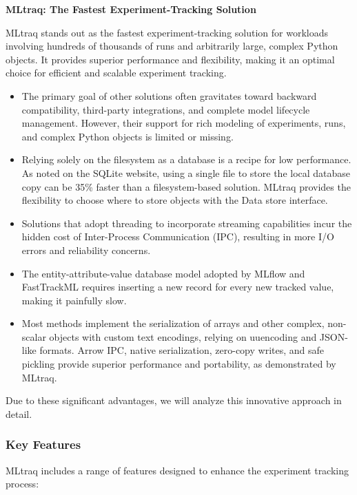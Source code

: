 \textbf{MLtraq: The Fastest Experiment-Tracking Solution}

MLtraq stands out as the fastest experiment-tracking solution for workloads involving hundreds of thousands of runs and arbitrarily large, complex Python objects. It provides superior performance and flexibility, making it an optimal choice for efficient and scalable experiment tracking.

\begin{itemize}
    \item The primary goal of other solutions often gravitates toward backward compatibility, third-party integrations, and complete model lifecycle management. However, their support for rich modeling of experiments, runs, and complex Python objects is limited or missing.
    \item Relying solely on the filesystem as a database is a recipe for low performance. As noted on the SQLite website, using a single file to store the local database copy can be 35\% faster than a filesystem-based solution. MLtraq provides the flexibility to choose where to store objects with the Data store interface.
    \item Solutions that adopt threading to incorporate streaming capabilities incur the hidden cost of Inter-Process Communication (IPC), resulting in more I/O errors and reliability concerns.
    \item The entity-attribute-value database model adopted by MLflow and FastTrackML requires inserting a new record for every new tracked value, making it painfully slow.
    \item Most methods implement the serialization of arrays and other complex, non-scalar objects with custom text encodings, relying on uuencoding and JSON-like formats. Arrow IPC, native serialization, zero-copy writes, and safe pickling provide superior performance and portability, as demonstrated by MLtraq.
\end{itemize}

Due to these significant advantages, we will analyze this innovative approach in detail.


\subsubsection{Key Features}

MLtraq includes a range of features designed to enhance the experiment tracking process:

